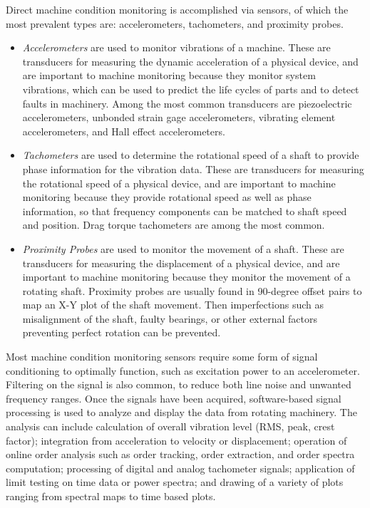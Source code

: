 
Direct machine condition monitoring is accomplished via sensors, of which the most prevalent types are: accelerometers, tachometers, and proximity probes.  

\begin{itemize}

\item \emph{Accelerometers} are used to monitor vibrations of a machine. These are transducers for measuring the dynamic acceleration of a physical device, and are important to machine monitoring because they monitor system vibrations, which can be used to predict the life cycles of parts and to detect faults in machinery. Among the most common transducers are piezoelectric accelerometers, unbonded strain gage accelerometers, vibrating element accelerometers, and Hall effect accelerometers.

\item \emph{Tachometers} are used to determine the rotational speed of a shaft to provide phase information for the vibration data. These are transducers for measuring the rotational speed of a physical device, and are important to machine monitoring because they provide rotational speed as well as phase information, so that frequency components can be matched to shaft speed and position. Drag torque tachometers are among the most common. 

\item \emph{Proximity Probes} are used to monitor the movement of a shaft. These are transducers for measuring the displacement of a physical device, and are important to machine monitoring because they monitor the movement of a rotating shaft. Proximity probes are usually found in 90-degree offset pairs to map an X-Y plot of the shaft movement. Then imperfections such as misalignment of the shaft, faulty bearings, or other external factors preventing perfect rotation can be prevented. 

\end{itemize}

Most machine condition monitoring sensors require some form of signal conditioning to optimally function, such as excitation power to an accelerometer. Filtering on the signal is also common, to reduce both line noise and unwanted frequency ranges. Once the signals have been acquired, software-based signal processing is used to analyze and display the data from rotating machinery. The analysis can include calculation of overall vibration level (RMS, peak, crest factor); integration from acceleration to velocity or displacement; operation of  online order analysis such as order tracking, order extraction, and order spectra computation; processing of digital and analog tachometer signals; application of limit testing on time data or power spectra; and drawing of a variety of plots ranging from spectral maps to time based plots.

